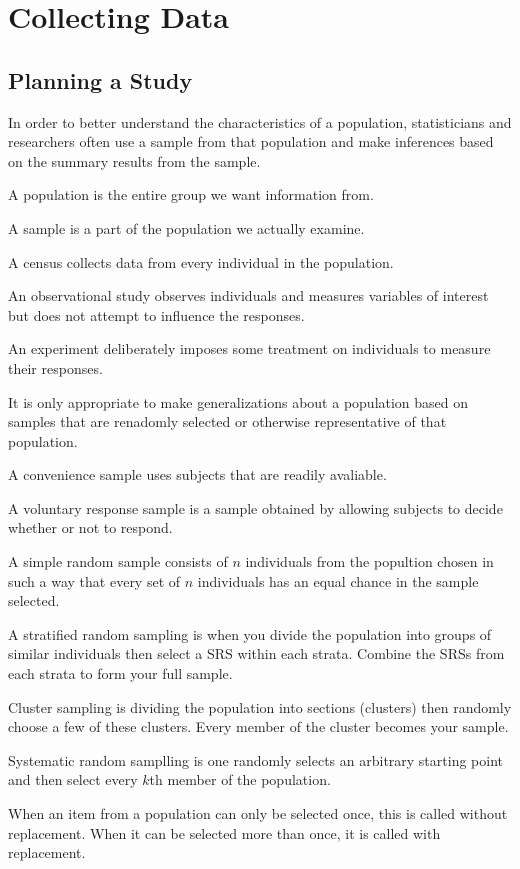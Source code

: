 \documentclass[../stats.tex]{subfiles}
\begin{document}
\chapter{Collecting Data}
\section{Planning a Study}
In order to better understand the characteristics of a population, statisticians and researchers often use a sample from that population and make inferences based on the summary results from the sample.

A population is the entire group we want information from.

A sample is a part of the population we actually examine.

A census collects data from every individual in the population.

An observational study observes individuals and measures variables of interest but does not attempt to influence the responses.

An experiment deliberately imposes some treatment on individuals to measure their responses.

It is only appropriate to make generalizations about a population based on samples that are renadomly selected or otherwise representative of that population.

A convenience sample uses subjects that are readily avaliable.

A voluntary response sample is a sample obtained by allowing subjects to decide whether or not to respond.

A simple random sample consists of $n$ individuals from the popultion chosen in such a way that every set of $n$ individuals has an equal chance in the sample selected.

A stratified random sampling is when you divide the population into groups of similar individuals then select a SRS within each strata. Combine the SRSs from each strata to form your full sample.

Cluster sampling is dividing the population into sections (clusters) then randomly choose a few of these clusters. Every member of the cluster becomes your sample.

Systematic random samplling is one randomly selects an arbitrary starting point and then select every $k$th member of the population.

When an item from a population can only be selected once, this is called without replacement. When it can be selected more than once, it is called with replacement.
\end{document}
